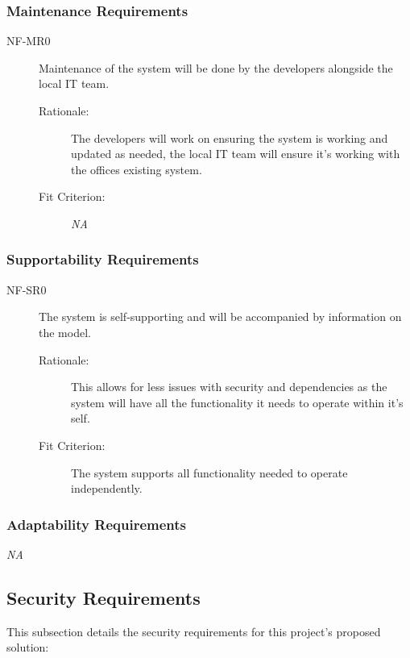 \documentclass[12pt]{article}
\begin{document}
\subsubsection{Maintenance Requirements}
\begin{description}
    \item[NF-MR0] Maintenance of the system will be done by the developers alongside the local IT team.
    \begin{description}
        \item[Rationale:] The developers will work on ensuring the system is working and updated as needed, the local IT team will ensure it's working with the offices existing system. 
        \item[Fit Criterion:] \textit{NA}
    \end{description}
\end{description}

\subsubsection{Supportability Requirements}
\begin{description}
    \item[NF-SR0] The system is self-supporting and will be accompanied by information on the model. 
    \begin{description}
        \item[Rationale:] This allows for less issues with security and dependencies as the system will have all the functionality it needs to operate within it's self.
        \item[Fit Criterion:] The system supports all functionality needed to operate independently. 
    \end{description}
\end{description}

\subsubsection{Adaptability Requirements}
\textit{NA}

\subsection{Security Requirements}
This subsection details the security requirements for this project's proposed solution:
\end{document}
